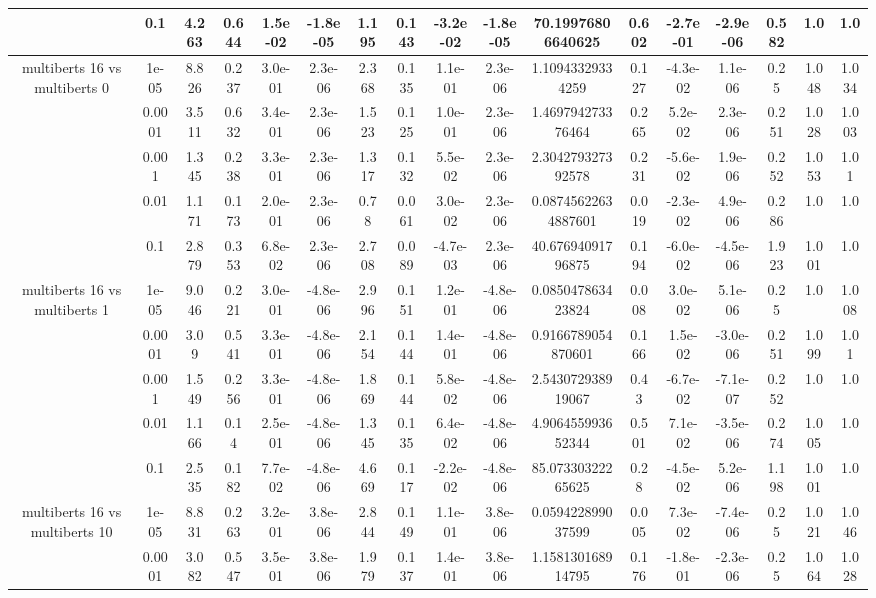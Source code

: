 \begin{tabular}{|c|c|c|c|c|c|c|c|c|c|c|c|c|c|c|c|c|}
 & 0.1 & 4.263 & 0.644 & 1.5e-02 & -1.8e-05 & 1.195 & 0.143 & -3.2e-02 & -1.8e-05 & 70.19976806640625 & 0.602 & -2.7e-01 & -2.9e-06 & 0.582 & 1.0 & 1.0 \\
\hline
\multirow{5}{*}{multiberts 16 vs multiberts 0} & 1e-05 & 8.826 & 0.237 & 3.0e-01 & 2.3e-06 & 2.368 & 0.135 & 1.1e-01 & 2.3e-06 & 1.10943329334259 & 0.127 & -4.3e-02 & 1.1e-06 & 0.25 & 1.048 & 1.034 \\
 & 0.0001 & 3.511 & 0.632 & 3.4e-01 & 2.3e-06 & 1.523 & 0.125 & 1.0e-01 & 2.3e-06 & 1.469794273376464 & 0.265 & 5.2e-02 & 2.3e-06 & 0.251 & 1.028 & 1.003 \\
 & 0.001 & 1.345 & 0.238 & 3.3e-01 & 2.3e-06 & 1.317 & 0.132 & 5.5e-02 & 2.3e-06 & 2.304279327392578 & 0.231 & -5.6e-02 & 1.9e-06 & 0.252 & 1.053 & 1.01 \\
 & 0.01 & 1.171 & 0.173 & 2.0e-01 & 2.3e-06 & 0.78 & 0.061 & 3.0e-02 & 2.3e-06 & 0.08745622634887601 & 0.019 & -2.3e-02 & 4.9e-06 & 0.286 & 1.0 & 1.0 \\
 & 0.1 & 2.879 & 0.353 & 6.8e-02 & 2.3e-06 & 2.708 & 0.089 & -4.7e-03 & 2.3e-06 & 40.67694091796875 & 0.194 & -6.0e-02 & -4.5e-06 & 1.923 & 1.001 & 1.0 \\
\hline
\multirow{5}{*}{multiberts 16 vs multiberts 1} & 1e-05 & 9.046 & 0.221 & 3.0e-01 & -4.8e-06 & 2.996 & 0.151 & 1.2e-01 & -4.8e-06 & 0.085047863423824 & 0.008 & 3.0e-02 & 5.1e-06 & 0.25 & 1.0 & 1.008 \\
 & 0.0001 & 3.09 & 0.541 & 3.3e-01 & -4.8e-06 & 2.154 & 0.144 & 1.4e-01 & -4.8e-06 & 0.9166789054870601 & 0.166 & 1.5e-02 & -3.0e-06 & 0.251 & 1.099 & 1.01 \\
 & 0.001 & 1.549 & 0.256 & 3.3e-01 & -4.8e-06 & 1.869 & 0.144 & 5.8e-02 & -4.8e-06 & 2.543072938919067 & 0.43 & -6.7e-02 & -7.1e-07 & 0.252 & 1.0 & 1.0 \\
 & 0.01 & 1.166 & 0.14 & 2.5e-01 & -4.8e-06 & 1.345 & 0.135 & 6.4e-02 & -4.8e-06 & 4.906455993652344 & 0.501 & 7.1e-02 & -3.5e-06 & 0.274 & 1.005 & 1.0 \\
 & 0.1 & 2.535 & 0.182 & 7.7e-02 & -4.8e-06 & 4.669 & 0.117 & -2.2e-02 & -4.8e-06 & 85.07330322265625 & 0.28 & -4.5e-02 & 5.2e-06 & 1.198 & 1.001 & 1.0 \\
\hline
\multirow{5}{*}{multiberts 16 vs multiberts 10} & 1e-05 & 8.831 & 0.263 & 3.2e-01 & 3.8e-06 & 2.844 & 0.149 & 1.1e-01 & 3.8e-06 & 0.059422899037599 & 0.005 & 7.3e-02 & -7.4e-06 & 0.25 & 1.021 & 1.046 \\
 & 0.0001 & 3.082 & 0.547 & 3.5e-01 & 3.8e-06 & 1.979 & 0.137 & 1.4e-01 & 3.8e-06 & 1.158130168914795 & 0.176 & -1.8e-01 & -2.3e-06 & 0.25 & 1.064 & 1.028 \\

\end{tabular}
